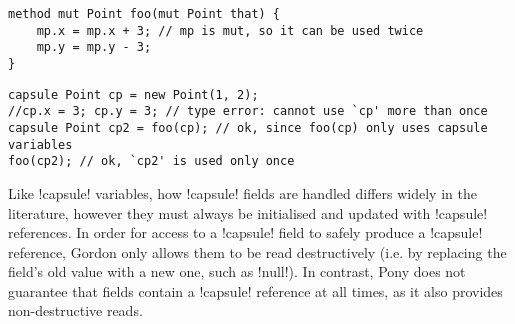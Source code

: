 \SS
\begin{lstlisting}
method mut Point foo(mut Point that) {
	mp.x = mp.x + 3; // mp is mut, so it can be used twice
	mp.y = mp.y - 3;
}
\end{lstlisting}
\begin{lstlisting}
capsule Point cp = new Point(1, 2);
//cp.x = 3; cp.y = 3; // type error: cannot use `cp' more than once
capsule Point cp2 = foo(cp); // ok, since foo(cp) only uses capsule variables
foo(cp2); // ok, `cp2' is used only once
\end{lstlisting}

Like \Q!capsule! variables, how \Q!capsule! fields are handled differs widely in the literature, however they must always be initialised and updated with \Q!capsule! references. In order for access to a \Q!capsule! field to safely produce a \Q!capsule! reference, Gordon \etal only allows them to be read destructively (i.e. by replacing the field's old value with a new one, such as \Q!null!). 
In contrast, 
Pony does not guarantee that \Q@capsule@ fields contain a \Q!capsule! reference at all times, as it also provides non-destructive reads.


